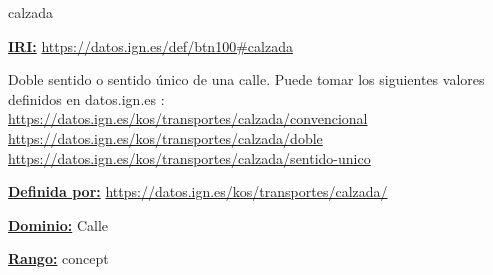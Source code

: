 \begin{mybox}{calzada}
\begin{flushleft}
\underline{\textbf{IRI:}}
\url{https://datos.ign.es/def/btn100#calzada}
\newline

Doble sentido o sentido único de una calle.
Puede tomar los siguientes valores definidos en datos.ign.es \cite{datosIgn_calzada}:
\newline \url{https://datos.ign.es/kos/transportes/calzada/convencional}
\newline \url{https://datos.ign.es/kos/transportes/calzada/doble}
\newline \url{https://datos.ign.es/kos/transportes/calzada/sentido-unico}
\newline

\underline{\textbf{Definida por:}}
\url{https://datos.ign.es/kos/transportes/calzada/}
\newline

\underline{\textbf{Dominio:}}
		Calle
\newline

\underline{\textbf{Rango:}}
\newline concept

\end{flushleft}
\end{mybox}














